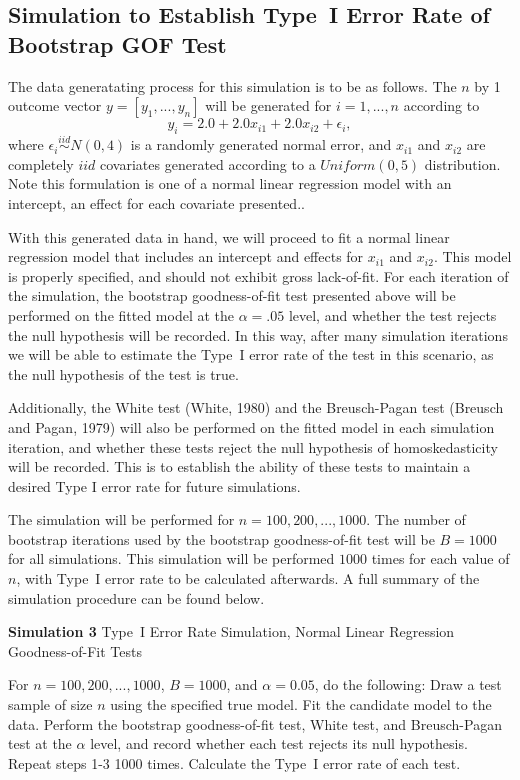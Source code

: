 		\subsection{Simulation to Establish Type~I Error Rate of Bootstrap GOF Test}

		The data generatating process for this simulation is to be as follows. The $n$ by 1 outcome vector $y = [y_1,...,y_n]$ will be generated for $i = 1,...,n$ according
		to
		\begin{equation}
			y_i = 2.0 + 2.0 x_{i1} + 2.0 x_{i2} + \epsilon_i , 
		\end{equation}
		where $\epsilon_i \stackrel{iid}{\sim} N(0,4)$ is a randomly generated normal error, and $x_{i1}$ and $x_{i2}$ are completely $iid$ covariates generated according to
		a $Uniform(0,5)$ distribution. Note this formulation is one of a normal linear regression model with an intercept, an effect for each covariate presented..

		With this generated data in hand, we will proceed to fit a normal linear regression model that includes an intercept and effects for $x_{i1}$ and $x_{i2}$. This model
		is properly specified, and should not exhibit gross lack-of-fit. For each iteration of the simulation, the bootstrap goodness-of-fit test presented above will be
		performed on the fitted model at the $\alpha = .05$ level, and whether the test rejects the null hypothesis will be recorded. In this way, after many simulation iterations
		we will be able to estimate the Type~I error rate of the test in this scenario, as the null hypothesis of the test is true.

		Additionally, the White test (White, 1980) and the Breusch-Pagan test (Breusch and Pagan, 1979) will also be performed on the fitted model in each simulation iteration, and
		whether these tests reject the null hypothesis of homoskedasticity will be recorded. This is to establish the ability of these tests to maintain a desired Type
		I error rate for future simulations.

		The simulation will be performed for $n = 100,200,...,1000$. The number of bootstrap iterations used by the bootstrap goodness-of-fit test will be $B = 1000$ for all simulations.
		This simulation will be performed $1000$ times for each value of $n$, with Type~I error rate to be calculated afterwards. A full summary of the simulation procedure can be found below.
		\begin{algorithm}[H]
			\caption*{\textbf{Simulation 3} Type~I Error Rate Simulation, Normal Linear Regression Goodness-of-Fit Tests}
			\begin{algorithmic}[1]
			  \Statex For $n = 100,200,...,1000$, $B = 1000$, and $\alpha = 0.05$, do the following:
			  \State Draw a test sample of size $n$ using the specified true model.
			  \State Fit the candidate model to the data.
			  \State Perform the bootstrap goodness-of-fit test, White test, and Breusch-Pagan test at the $\alpha$ level,
			  and record whether each test rejects its null hypothesis.
			  \State Repeat steps 1-3 1000 times.
			  \State Calculate the Type~I error rate of each test.
			\end{algorithmic}
		\end{algorithm}

